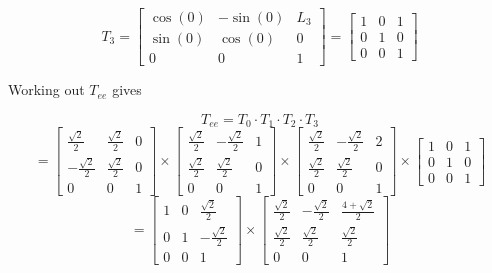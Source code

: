 \documentclass{article}
\begin{document}
\[
	T_3= \begin{bmatrix}
		\cos(0) & -\sin(0) & L_3 \\
		\sin(0) & \cos(0)  & 0   \\
		0       & 0        & 1
	\end{bmatrix}
	=
	\begin{bmatrix}
		1 & 0 & 1 \\
		0 & 1 & 0 \\
		0 & 0 & 1
	\end{bmatrix}
\]

Working out $T_{ee}$ gives

\[
	T_{ee} = T_0 \cdot T_1 \cdot T_2 \cdot T_3
\]
\[
	=
	\begin{bmatrix}
		\frac{\sqrt{2}}{2}  & \frac{\sqrt{2}}{2} & 0 \\
		-\frac{\sqrt{2}}{2} & \frac{\sqrt{2}}{2} & 0 \\
		0                   & 0                  & 1
	\end{bmatrix}
	\times
	\begin{bmatrix}
		\frac{\sqrt{2}}{2} & -\frac{\sqrt{2}}{2} & 1 \\
		\frac{\sqrt{2}}{2} & \frac{\sqrt{2}}{2}  & 0 \\
		0                  & 0                   & 1
	\end{bmatrix}
	\times
	\begin{bmatrix}
		\frac{\sqrt{2}}{2} & -\frac{\sqrt{2}}{2} & 2 \\
		\frac{\sqrt{2}}{2} & \frac{\sqrt{2}}{2}  & 0 \\
		0                  & 0                   & 1
	\end{bmatrix}
	\times
	\begin{bmatrix}
		1 & 0 & 1 \\
		0 & 1 & 0 \\
		0 & 0 & 1
	\end{bmatrix}
\]
\[
	=
	\begin{bmatrix}
		1 & 0 & \frac{\sqrt{2}}{2}  \\
		0 & 1 & -\frac{\sqrt{2}}{2} \\
		0 & 0 & 1
	\end{bmatrix}
	\times
	\begin{bmatrix}
		\frac{\sqrt{2}}{2} & -\frac{\sqrt{2}}{2} & \frac{4+\sqrt{2}}{2} \\
		\frac{\sqrt{2}}{2} & \frac{\sqrt{2}}{2}  & \frac{\sqrt{2}}{2}   \\
		0                  & 0                   & 1
	\end{bmatrix}
\]
\end{document}
